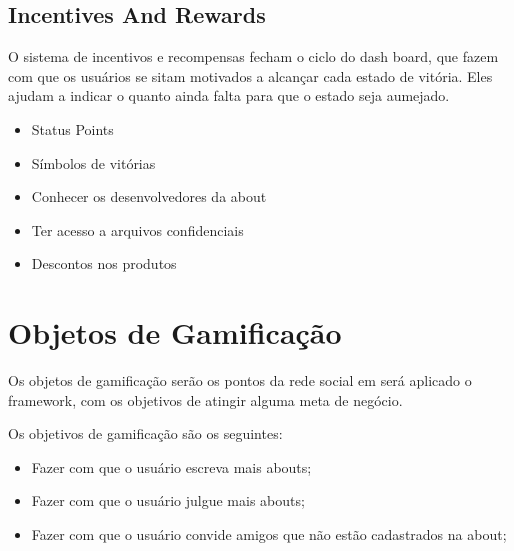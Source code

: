 \subsection{Incentives And Rewards}
\label{sub:incentives_and_rewards}
O sistema de incentivos e recompensas fecham o ciclo do dash board, que fazem com que 
os usuários se sitam motivados a alcançar cada estado de vitória. Eles ajudam a indicar
o quanto ainda falta para que o estado seja aumejado.

\begin{itemize}
    \item Status Points
    \item Símbolos de vitórias
    \item Conhecer os desenvolvedores da about
    \item Ter acesso a arquivos confidenciais
    \item Descontos nos produtos
\end{itemize}

\section{Objetos de Gamificação}
\label{sec:objetodegamificacao}
Os objetos de gamificação serão os pontos da rede social em será aplicado o framework,
com os objetivos de atingir alguma meta de negócio.

Os objetivos de gamificação são os seguintes:

\begin{itemize}
    \item Fazer com que o usuário escreva mais abouts;
    \item Fazer com que o usuário julgue mais abouts;
    \item Fazer com que o usuário convide amigos que não estão cadastrados na about;
\end{itemize}
